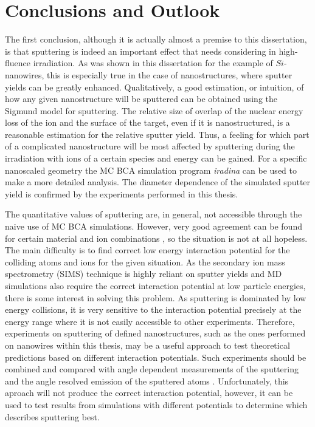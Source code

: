 \chapter{Conclusions and Outlook}

The first conclusion, although it is actually almost a premise to this dissertation, is that sputtering is indeed an important effect that needs considering in high-fluence irradiation. As was shown in this dissertation for the example of $Si$-nanowires, this is especially true in the case of nanostructures, where sputter yields can be greatly enhanced. Qualitatively, a good estimation, or intuition, of how any given nanostructure will be sputtered can be obtained using the Sigmund model for sputtering. The relative size of overlap of the nuclear energy loss of the ion and the surface of the target, even if it is nanostructured, is a reasonable estimation for the relative sputter yield. Thus, a feeling for which part of a complicated nanostructure will be most affected by sputtering during the irradiation with ions of a certain species and energy can be gained. For a specific nanoscaled geometry the MC BCA simulation program \emph{iradina} \cite{borschel_ion_2011} can be used to make a more detailed analysis. The diameter dependence of the simulated sputter yield is confirmed by the experiments performed in this thesis.

The quantitative values of sputtering are, in general, not accessible through the naive use of MC BCA simulations. However, very good agreement can be found for certain material and ion combinations \cite{biersack_computer_1987,hofsass_simulation_2014}, so the situation is not at all hopeless. The main difficulty is to find correct low energy interaction potential for the colliding atoms and ions for the given situation. As the secondary ion mass spectrometry (SIMS) technique is highly reliant on sputter yields and MD simulations also require the correct interaction potential at low particle energies, there is some interest in solving this problem. As sputtering is dominated by low energy collisions, it is very sensitive to the interaction potential precisely at the energy range where it is not easily accessible to other experiments. Therefore, experiments on sputtering of defined nanostructures, such as the ones performed on nanowires within this thesis, may be a useful approach to test theoretical predictions based on different interaction potentials. Such experiments should be combined and compared with angle dependent measurements of the sputtering \cite{hofsass_simulation_2014} and the angle resolved emission of the sputtered atoms \cite{wirtz_storing_2008,verdeil_angular_2008}. Unfortunately, this aproach will not produce the correct interaction potential, however, it can be used to test results from simulations with different potentials to determine which describes sputtering best.

